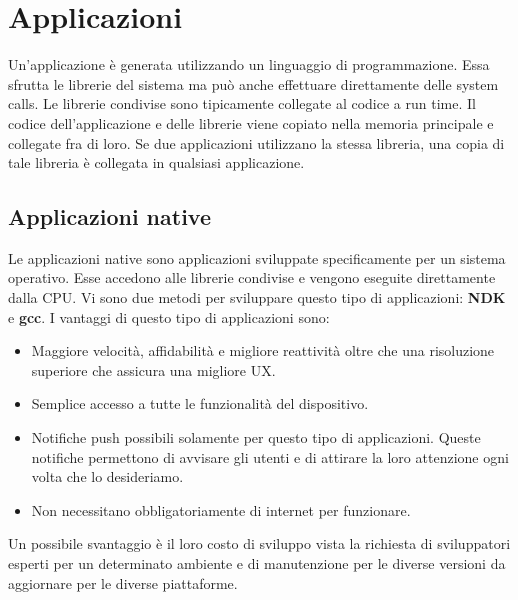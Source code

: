 \section{Applicazioni}
Un'applicazione è generata utilizzando un linguaggio di programmazione. Essa sfrutta le librerie del sistema ma può anche effettuare direttamente delle system calls. Le librerie condivise sono tipicamente collegate al codice a run time. Il codice dell'applicazione e delle librerie viene copiato nella memoria principale e collegate fra di loro. Se due applicazioni utilizzano la stessa libreria, una copia di tale libreria è collegata in qualsiasi applicazione.
\subsection{Applicazioni native}
Le applicazioni native sono applicazioni sviluppate specificamente per un sistema operativo. Esse accedono alle librerie condivise e vengono eseguite direttamente dalla CPU. Vi sono due metodi per sviluppare questo tipo di applicazioni: \textbf{NDK} e \textbf{gcc}. I vantaggi di questo tipo di applicazioni sono: 
\begin{itemize}
\item Maggiore velocità, affidabilità e migliore reattività oltre che una risoluzione superiore che assicura una migliore UX.
\item Semplice accesso a tutte le funzionalità del dispositivo.
\item Notifiche push possibili solamente per questo tipo di applicazioni. Queste notifiche permettono di avvisare gli utenti e di attirare la loro attenzione ogni volta che lo desideriamo.
\item Non necessitano obbligatoriamente di internet per funzionare.
\end{itemize}
Un possibile svantaggio è il loro costo di sviluppo vista la richiesta di sviluppatori esperti per un determinato ambiente e di manutenzione per le diverse versioni da aggiornare per le diverse piattaforme.
